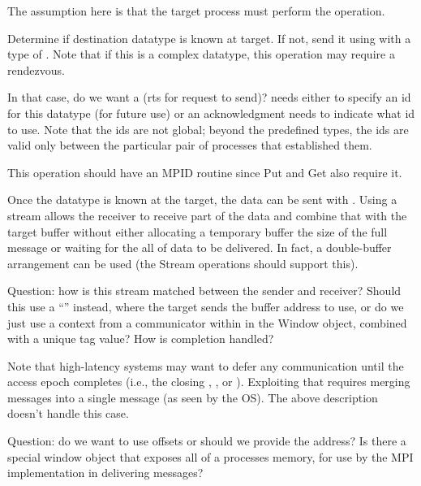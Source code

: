 \documentclass{article}
\begin{document}
\begin{tcp}
The assumption here is that the target process must perform the operation.

Determine if destination datatype is known at target.  If not, send it using
 with a type of .  Note
that if this is a complex datatype, this operation may require a rendezvous.

In that case, do we want a  (rts for
request to send)?  
 needs either to specify an id for this
datatype (for future use) or an acknowledgment needs to indicate what id to
use.  Note that the ids are not global; beyond the predefined types, the ids
are valid only between the particular pair of processes that established them.

This operation should have an MPID routine since Put and Get also require it. 

Once the datatype is known at the target, the data can be sent with
.  Using a stream allows the receiver to receive
part of the data and combine that with the target buffer without either
allocating a temporary buffer the size of the full message or waiting for the
all of data to be delivered.  In fact, a double-buffer arrangement can be used
(the Stream operations should support this).  

Question: how is this stream matched between the sender and receiver?  Should
this use a ``'' instead, where the target sends the buffer
address 
to use, or do we just use a context from a communicator within in the Window
object, combined with a unique tag value?  How is completion handled?

Note that high-latency systems may want to defer any communication until the
access epoch completes (i.e., the closing ,
, or ).  Exploiting that
requires merging messages into a 
single message (as seen by the OS).  The above description doesn't handle this
case. 

Question: do we want to use offsets or should we provide the address?  Is
there a special window object that exposes all of a processes memory, for use
by the MPI implementation in delivering messages?
\end{tcp}
\end{document}
